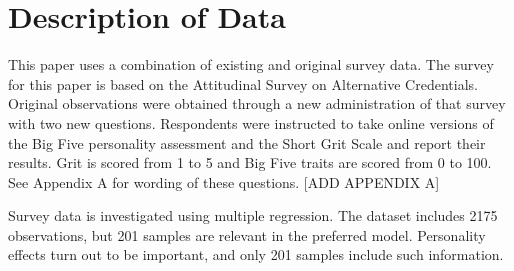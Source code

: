\documentclass[review]{elsarticle}
\begin{document}

\section{Description of Data}

This paper uses a combination of existing and original survey data.
The survey for this paper is based on the Attitudinal Survey on Alternative Credentials\cite{dataset_vandivier}.
Original observations were obtained through a new administration of that survey with two new questions.
Respondents were instructed to take online versions of the Big Five personality assessment and the Short Grit Scale and report their results.
Grit is scored from 1 to 5 and Big Five traits are scored from 0 to 100.
See Appendix A for wording of these questions.
    [ADD APPENDIX A]

Survey data is investigated using multiple regression.
The dataset includes 2175 observations, but 201 samples are relevant in the preferred model.
Personality effects turn out to be important, and only 201 samples include such information.
\end{document}
